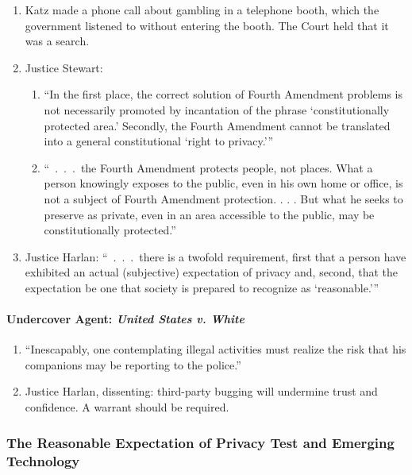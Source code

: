\begin{enumerate}
    \item Katz made a phone call about gambling in a telephone booth, which 
    the government listened to without entering the booth. The Court held that 
    it was a search.
    \item Justice Stewart:
    \begin{enumerate}
        \item \enquote{In the first place, the correct solution of Fourth 
        Amendment problems is not necessarily promoted by incantation of the 
        phrase \enquote{constitutionally protected area.} Secondly, the Fourth 
        Amendment cannot be translated into a general constitutional 
        \enquote{right to privacy.}}
        \item ``~.~.~.~the Fourth Amendment protects people, not places. What 
        a person knowingly exposes to the public, even in his own home or 
        office, is not a subject of Fourth Amendment protection. . . . But 
        what he seeks to preserve as private, even in an area accessible to 
        the public, may be constitutionally protected.''
    \end{enumerate}
    \item Justice Harlan: \enquote{~.~.~.~there is a twofold requirement, 
    first that a person have exhibited an actual (subjective) expectation of 
    privacy and, second, that the expectation be one that society is prepared 
    to recognize as \enquote{reasonable.}}
\end{enumerate}

\paragraph{Undercover Agent: \emph{United States v. White}}

\begin{enumerate}
    \item ``Inescapably, one contemplating illegal activities must realize the 
    risk that his companions may be reporting to the police.''
    \item Justice Harlan, dissenting: third-party bugging will undermine trust 
    and confidence. A warrant should be required.
\end{enumerate}

\subsubsection{The Reasonable Expectation of Privacy Test and Emerging 
Technology}

